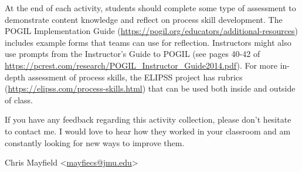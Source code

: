 \bigskip

At the end of each activity, students should complete some type of assessment to demonstrate content knowledge and reflect on process skill development. The POGIL Implementation Guide (\url{https://pogil.org/educators/additional-resources}) includes example forms that teams can use for reflection. Instructors might also use prompts from the Instructor's Guide to POGIL (see pages 40-42 of \url{https://pcrest.com/research/POGIL_Instructor_Guide2014.pdf}). For more in-depth assessment of process skills, the ELIPSS project has rubrics (\url{https://elipss.com/process-skills.html}) that can be used both inside and outside of class.

\bigskip

If you have any feedback regarding this activity collection, please don't hesitate to contact me. I would love to hear how they worked in your classroom and am constantly looking for new ways to improve them.

\bigskip

\newcommand{\email}[1]{<\href{mailto:#1}{#1}>}

Chris Mayfield \email{mayfiecs@jmu.edu}

